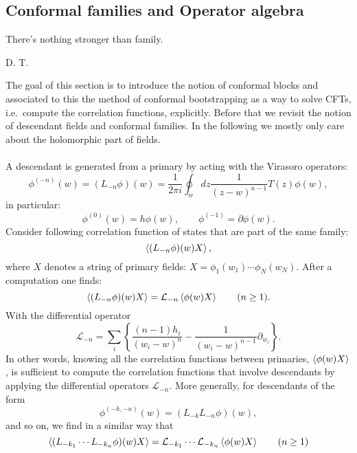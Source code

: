 \documentclass[submission, PhysLectNotes]{SciPost}
\begin{document}
\subsection{Conformal families and Operator algebra}
\epigraph{There's nothing stronger than family.}{D. T.}

The goal of this section is to introduce the notion of conformal blocks and associated to this the method of conformal bootstrapping as a way to solve CFTs, i.e.\ compute the correlation functions, explicitly. Before that we revisit the notion of descendant fields and conformal families. In the following we mostly only care about the holomorphic part of fields.\\

\\
A descendant is generated from a primary by acting with the Virasoro operators:
\begin{equation}
	\phi^{(-n)}(w) = (L_{-n}\phi)(w) = \frac{1}{2\pi i}\oint_w dz \frac{1}{{(z-w)}^{n-1}}T(z)\phi(w),
\end{equation}
in particular:
\begin{equation}
	\phi^{(0)}(w) = h\phi(w), \qquad \phi^{(-1)} = \partial \phi(w).
\end{equation}
Consider following correlation function of states that are part of the same family:
\begin{equation}
	\expval{(L_{-n}\phi)(w)X},
\end{equation}
where $X$ denotes a string of primary fields: $X=\phi_1(w_1)\cdots \phi_N(w_N)$. After a computation one finds:
\begin{equation}
	\expval{(L_{-n}\phi)(w)X} = \mathcal{L}_{-n}\expval{\phi(w)X} \qquad (n\geq 1).
\end{equation}
With the differential operator
\begin{equation}
	\mathcal{L}_{-n} = \sum_i \left\{ \frac{(n-1)h_i}{{(w_i - w)}^n} - \frac{1}{{(w_i - w)}^{n-1}}\partial_{w_i}\right\}.
\end{equation}
In other words, knowing all the correlation functions between primaries, $\expval{\phi(w)X}$, is sufficient to compute the correlation functions that involve descendants by applying the differential operators $\mathcal{L}_{-n}$. More generally, for descendants of the form
\begin{equation}
	\phi^{(-k,-n)}(w) = (L_{-k}L_{-n}\phi)(w),
\end{equation}
and so on, we find in a similar way that
\begin{equation}
	\expval{(L_{-k_1}\cdots L_{-k_n}\phi)(w)X} = \mathcal{L}_{-k_1}\cdots \mathcal{L}_{-k_n}\expval{\phi(w)X} \qquad (n\geq 1)
\end{equation}\\
\end{document}
